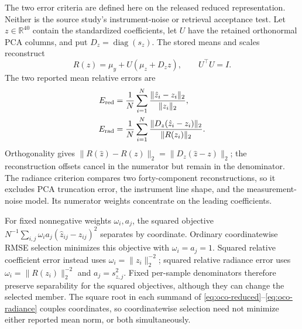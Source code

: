 \documentclass[twoside,11pt]{article}
\begin{document}
The two error criteria are defined here on the released reduced
representation. Neither is the source study's instrument-noise or retrieval
acceptance test. Let $z\in\mathbb R^{40}$ contain the standardized
coefficients, let $U$ have the retained orthonormal PCA columns, and put
$D_z=\operatorname{diag}(s_z)$. The stored means and scales reconstruct
\begin{equation}
 R(z)=\mu_y+U(\mu_z+D_z z),\qquad U^\top U=I.
 \label{eq:oco-reconstruction}
\end{equation}
The two reported mean relative errors are
\begin{align}
 E_{\rm red}&=\frac1N\sum_{i=1}^N
       \frac{\|\hat z_i-z_i\|_2}{\|z_i\|_2},
       \label{eq:oco-reduced}\\
 E_{\rm rad}&=\frac1N\sum_{i=1}^N
       \frac{\|D_z(\hat z_i-z_i)\|_2}{\|R(z_i)\|_2}.
       \label{eq:oco-radiance}
\end{align}
Orthogonality gives $\|R(\hat z)-R(z)\|_2
=\|D_z(\hat z-z)\|_2$; the reconstruction offsets cancel in the
numerator but remain in the denominator. The radiance criterion compares
two forty-component reconstructions, so it excludes PCA truncation error,
the instrument line shape, and the measurement-noise model. Its numerator
weights concentrate on the leading coefficients.

For fixed nonnegative weights $\omega_i,a_j$, the squared objective
$N^{-1}\sum_{i,j}\omega_i a_j(\hat z_{ij}-z_{ij})^2$ separates by
coordinate. Ordinary coordinatewise RMSE selection minimizes this
objective with $\omega_i=a_j=1$. Squared relative coefficient error instead
uses $\omega_i=\|z_i\|_2^{-2}$; squared relative radiance error uses
$\omega_i=\|R(z_i)\|_2^{-2}$ and $a_j=s_{z,j}^2$. Fixed per-sample
denominators therefore preserve separability for the squared objectives,
although they can change the selected member. The square root in each
summand of \eqref{eq:oco-reduced}--\eqref{eq:oco-radiance} couples
coordinates, so coordinatewise selection need not minimize either reported
mean norm, or both simultaneously.
\end{document}
